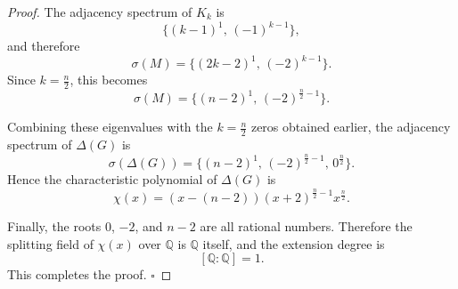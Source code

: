 \documentclass[11pt]{amsart}
\begin{document}
\begin{proof}
The adjacency spectrum of \(K_k\) is
\[
\{(k-1)^1,\,(-1)^{k-1}\},
\]
and therefore
\[
\sigma(M)=\{(2k-2)^1,\,(-2)^{k-1}\}.
\]
Since \(k=\frac{n}{2}\), this becomes
\[
\sigma(M)=\{(n-2)^1,\,(-2)^{\frac{n}{2}-1}\}.
\]

Combining these eigenvalues with the \(k=\frac{n}{2}\) zeros obtained earlier, the adjacency spectrum of \(\Delta(G)\) is
\[
\sigma(\Delta(G))=\{(n-2)^1,\,(-2)^{\frac{n}{2}-1},\,0^{\frac{n}{2}}\}.
\]
Hence the characteristic polynomial of \(\Delta(G)\) is
\[
\chi(x)=(x-(n-2))(x+2)^{\frac{n}{2}-1}x^{\frac{n}{2}}.
\]

Finally, the roots \(0\), \(-2\), and \(n-2\) are all rational numbers. Therefore the splitting field of \(\chi(x)\) over \(\mathbb{Q}\) is \(\mathbb{Q}\) itself, and the extension degree is
\[
[\mathbb{Q}:\mathbb{Q}]=1.
\]
This completes the proof. \hfill $\square$
\end{proof}
\end{document}
